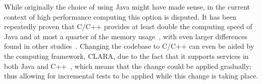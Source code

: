 While originally the choice of using Java might have made sense, in the current context of high performance computing this option is disputed.
It has been repeatedly proven that C/C++ provides at least double the computing speed of Java and at most a quarter of the memory usage~\cite{prechelt2000empirical}, with even larger differences found in other studies~\cite{prechelt1999comparing}.
Changing the codebase to C/C++ can even be aided by the computing framework, CLARA, due to the fact that it supports services in both Java and C++~\cite{gyurjyan2013clara}, which means that the change could be applied gradually; thus allowing for incremental tests to be applied while this change is taking place.